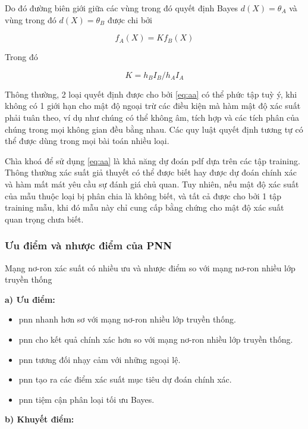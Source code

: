 Do đó đường biên giới giữa các vùng trong đó quyết định Bayes $d(X) = \theta_A$ và vùng trong đó $d(X) = \theta_B$ được chi bởi 

\begin{equation}
	f_A(X) = Kf_B(X)
	\label{eq:aa}
\end{equation}

Trong đó

\begin{equation}
	K=h_BI_B / h_AI_A
\end{equation}

Thông thường, 2 loại quyết định được cho bởi \eqref{eq:aa} có thể phức tập tuỳ ý, khi không có 1 giới hạn cho mật độ ngoại trừ các điều kiện mà hàm mật độ xác suất phải tuân theo, ví dụ như chúng có thể không âm, tích hợp và các tích phân của chúng trong mọi không gian đều bằng nhau. Các quy luật quyết định tương tự có thể được dùng trong mọi bài toán nhiều loại.

Chìa khoá để sử dụng \eqref{eq:aa} là khả năng dự đoán \ac{pdf} dựa trên các tập training. Thông thường xác suất giả thuyết có thể được biết hay được dự đoán chính xác và hàm mất mát yêu cầu sự đánh giá chủ quan. Tuy nhiên, nếu mật độ xác suất của mẫu thuộc loại bị phân chia là không biết, và tất cả được cho bởi 1 tập training mẫu, khi đó mẫu này chỉ cung cấp bằng chứng cho mật độ xác suất quan trọng chưa biết.
	
	


\subsubsection{Ưu điểm và nhược điểm của PNN}
Mạng nơ-ron xác suất có nhiều ưu và nhược điểm so với mạng nơ-ron nhiều lớp truyền thống

\textbf{a) Ưu điểm:}

\begin{itemize}
	\item \ac{pnn} nhanh hơn sơ với mạng nơ-ron nhiều lớp truyền thống.
	\item \ac{pnn} cho kết quả chính xác hơn so với mạng nơ-ron nhiều lớp truyền thống.
	\item \ac{pnn} tương đối nhạy cảm với những ngoại lệ.
	\item \ac{pnn} tạo ra các điểm xác suất mục tiêu dự đoán chính xác.
	\item \ac{pnn} tiệm cận phân loại tối ưu Bayes.
\end{itemize}

\textbf{b) Khuyết điểm:}

